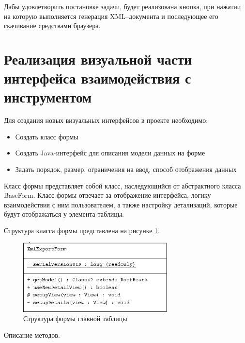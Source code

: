 \documentclass[a4paper,12pt]{diplom}
\begin{document}
Дабы удовлетворить постановке задачи, будет реализована кнопка, при нажатии на которую выполняется генерация XML--документа и последующее его скачивание средствами браузера.

\section{Реализация визуальной части интерфейса взаимодействия с инструментом}

Для создания новых визуальных интерфейсов в проекте необходимо:

\begin{itemize}
    \item Создать класс формы
    \item Создать Java-интерфейс для описания модели данных на форме
    \item Задать порядок, размер, ограничения на ввод, способ отображения данных
\end{itemize}

Класс формы представляет собой класс, наследующийся от абстрактного класса BaseForm. Класс формы отвечает за отображение интерфейса, логику взаимодействия с ним пользователем, а также настройку детализаций, которые будут отображаться у элемента таблицы. 

Структура класса формы представлена на рисунке \ref{fig:form}.

\begin{figure}[h!]
	\centering
	\includegraphics[width=0.7\textwidth]{imgs/XmlExportForm.jpg}
	\caption{Структура формы главной таблицы}
	\label{fig:form}
\end{figure}

Описание методов.
\end{document}
